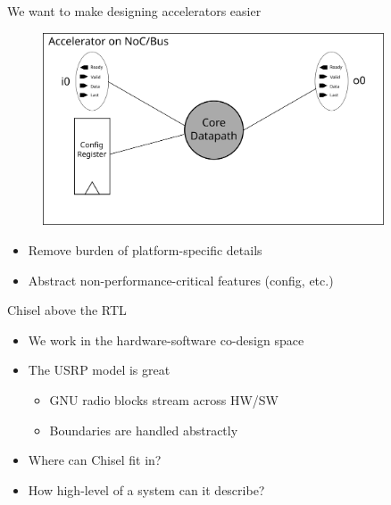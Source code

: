 \documentclass{beamer}
\begin{document}
\begin{frame}{We want to make designing accelerators easier}
  \begin{figure}
    \centering
    \includegraphics[width=0.9\textwidth]{figs/platform.svg}
  \end{figure}
  \begin{itemize}
    \item Remove burden of platform-specific details
    \item Abstract non-performance-critical features (config, etc.)
  \end{itemize}
\end{frame}

\begin{frame}{Chisel above the RTL}
  \begin{itemize}
  \item We work in the hardware-software co-design space
  \item The USRP model is great
    \begin{itemize}
    \item GNU radio blocks stream across HW/SW
    \item Boundaries are handled abstractly
    \end{itemize}
  \item Where can Chisel fit in?
  \item How high-level of a system can it describe?
  \end{itemize}
\end{frame}
\end{document}
